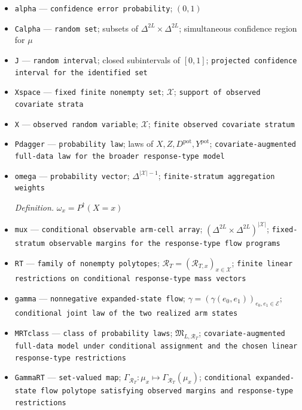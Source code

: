 \documentclass{article}
\begin{document}
\begin{itemize}
  \item \texttt{alpha} --- \texttt{confidence error probability}; \((0,1)\)
  \item \texttt{Calpha} --- \texttt{random set}; subsets of \(\Delta^{2L}\times\Delta^{2L}\); simultaneous confidence region for \(\mu\)
  \item \texttt{J} --- \texttt{random interval}; closed subintervals of \([0,1]\); \texttt{projected confidence interval for the identified set}
  \item \texttt{Xspace} --- \texttt{fixed finite nonempty set}; \(\mathcal X\); \texttt{support of observed covariate strata}
  \item \texttt{X} --- \texttt{observed random variable}; \(\mathcal X\); \texttt{finite observed covariate stratum}
  \item \texttt{Pdagger} --- \texttt{probability law}; laws of \(X,Z,D^{\mathrm{pot}},Y^{\mathrm{pot}}\); \texttt{covariate-\allowbreak{}augmented full-\allowbreak{}data law for the broader response-\allowbreak{}type model}
  \item \texttt{omega} --- \texttt{probability vector}; \(\Delta^{|\mathcal X|-1}\); \texttt{finite-\allowbreak{}stratum aggregation weights}
  \par\smallskip\noindent\emph{Definition.} \(\omega_x=P^{\dagger}(X=x)\)
  \item \texttt{mux} --- \texttt{conditional observable arm-\allowbreak{}cell array}; \((\Delta^{2L}\times\Delta^{2L})^{|\mathcal X|}\); \texttt{fixed-\allowbreak{}stratum observable margins for the response-\allowbreak{}type flow programs}
  \item \texttt{RT} --- \texttt{family of nonempty polytopes}; \(\mathcal R_T=(\mathcal R_{T,x})_{x\in\mathcal X}\); \texttt{finite linear restrictions on conditional response-\allowbreak{}type mass vectors}
  \item \texttt{gamma} --- \texttt{nonnegative expanded-\allowbreak{}state flow}; \(\gamma=(\gamma(e_0,e_1))_{e_0,e_1\in\mathcal E}\); \texttt{conditional joint law of the two realized arm states}
  \item \texttt{MRTclass} --- \texttt{class of probability laws}; \(\mathfrak M_{L,\mathcal R_T}\); \texttt{covariate-\allowbreak{}augmented full-\allowbreak{}data model under conditional assignment and the chosen linear response-\allowbreak{}type restrictions}
  \item \texttt{GammaRT} --- \texttt{set-\allowbreak{}valued map}; \(\Gamma_{\mathcal R_T}:\mu_x\mapsto\Gamma_{\mathcal R_T}(\mu_x)\); \texttt{conditional expanded-\allowbreak{}state flow polytope satisfying observed margins and response-\allowbreak{}type restrictions}

\end{itemize}
\end{document}
